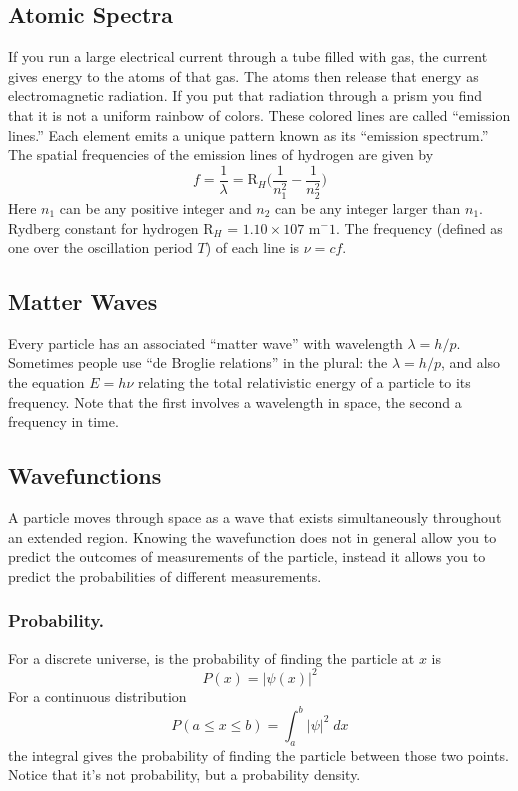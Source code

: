 \documentclass[../main.tex]{subfiles}
\begin{document}
\subsection*{Atomic Spectra}
If you run a large electrical current through a tube filled with gas, the current gives energy to the atoms of that gas. The atoms then release that energy as electromagnetic radiation. If you put that radiation through a prism you find that it is not a uniform rainbow of colors. These colored lines are called “emission lines.” Each element emits a unique pattern known as its “emission spectrum.” The spatial frequencies of the emission lines of hydrogen are given by
\begin{equation*}
    f=\frac{1}{\lambda}=\text{R}_H\biggl(\frac{1}{n_1^2}-\frac{1}{n_2^2}\biggr)
\end{equation*}
Here $n_1$ can be any positive integer and $n_2$ can be any integer larger than $n_1$. Rydberg constant
for hydrogen R$_H$ = $1.10 \times 10 7$ m${^-1}$. The frequency (defined as one over the oscillation period $T$) of each line is $\nu = cf $.

\subsection*{Matter Waves}
Every particle has an associated “matter wave” with wavelength $ \lambda = h/p$. Sometimes people use “de Broglie relations” in the plural: the $ \lambda = h/p$, and also the equation $E = h\nu$ relating the total relativistic energy of a particle to its frequency. Note that the first involves a wavelength in space, the second a frequency in time.

\subsection*{Wavefunctions }
A particle moves through space as a wave that exists simultaneously throughout an extended region. Knowing the wavefunction does not in general allow you to predict the outcomes of measurements of the particle, instead it allows you to predict the probabilities of different measurements.

\subsubsection*{Probability.} For a discrete universe, is the probability of finding the particle at $x$ is
\begin{equation*}
    P(x)=|\psi(x)|^2
\end{equation*}
For a continuous distribution 
\begin{equation*}
    P(a\leq x \leq b)=\int_{a}^{b}|\psi|^2\;dx
\end{equation*}
the integral gives the probability of finding the particle between those two points. Notice that it's not probability, but a probability density.
\end{document}
